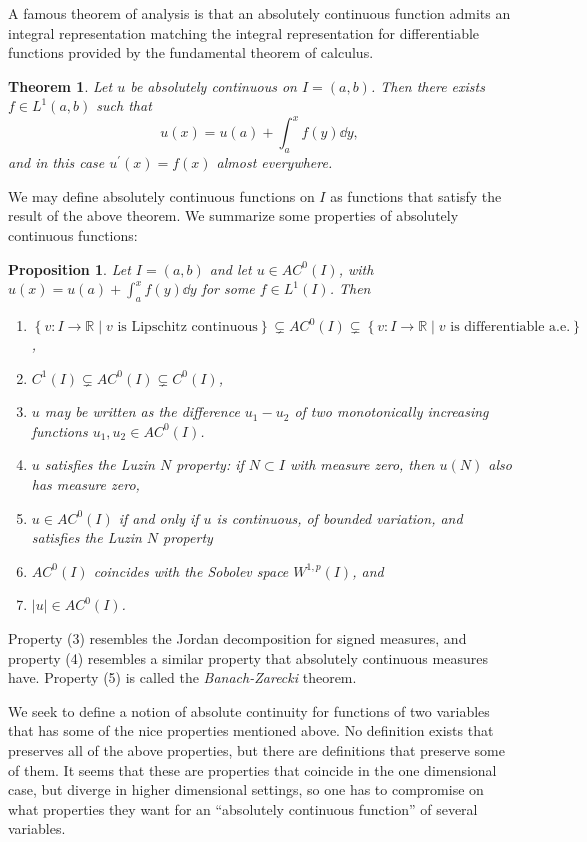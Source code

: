 \documentclass[11pt,leqno]{article}
\theoremstyle{plain}
\newtheorem{theorem}[lem]{Theorem}
\newtheorem{proposition}[lem]{Proposition}
\theoremstyle{definition}
\numberwithin{equation}{section}
\numberwithin{lem}{section}
\newcommand{\cbr}[1]{\left\{#1\right\}}
\begin{document}
A famous theorem of analysis is that an absolutely continuous function admits an integral representation matching the integral representation for differentiable functions provided by the fundamental theorem of calculus.
\begin{theorem}\label{thm1}
    Let $u$ be absolutely continuous on $I = (a,b)$. Then there exists $f\in L^1(a,b)$ such that 
    \begin{equation}\label{2}
        u(x) = u(a) + \int_a^x f(y)\dd y,
    \end{equation} 
    and in this case $u^\prime(x) = f(x)$ almost everywhere.
\end{theorem}
We may define absolutely continuous functions on $I$ as functions that satisfy the result of the above theorem.
We summarize some properties of absolutely continuous functions:
\begin{proposition}
    Let $I = (a,b)$ and let $u\in AC^0(I)$, with $u(x) = u(a) + \int_a^x f(y)\dd y$ for some $f\in L^1(I)$. Then \begin{enumerate}[label=\textup{(\arabic*)}]
        \item $\cbr{v\colon I\to \mathbb R\mid v \text{ is Lipschitz continuous}}\subsetneq AC^0(I)\subsetneq \cbr{v\colon I\to\mathbb R\mid v\text{ is differentiable a.e.}}$,
        \item $C^1(I)\subsetneq AC^0(I)\subsetneq C^0(I)$,
        \item $u$ may be written as the difference $u_1-u_2$ of two monotonically increasing functions $u_1,u_2\in AC^0(I)$.
        \item $u$ satisfies the Luzin $N$ property: if $N\subset I$ with measure zero, then $u(N)$ also has measure zero,
        \item $u\in AC^0(I)$ if and only if $u$ is continuous, of bounded variation, and satisfies the Luzin $N$ property
        \item $AC^0(I)$ coincides with the Sobolev space $W^{1,p}(I)$, and
        \item $|u|\in AC^0(I)$.
    \end{enumerate}
\end{proposition}
Property (3) resembles the Jordan decomposition for signed measures, and property (4) resembles a similar property that absolutely continuous measures have. Property (5) is called the \textit{Banach-Zarecki} theorem.

We seek to define a notion of absolute continuity for functions of two variables that has some of the nice properties mentioned above. No definition exists that preserves all of the above properties, but there are definitions that preserve some of them. It seems that these are properties that coincide in the one dimensional case, but diverge in higher dimensional settings, so one has to compromise on what properties they want for an ``absolutely continuous function'' of several variables.
\end{document}
